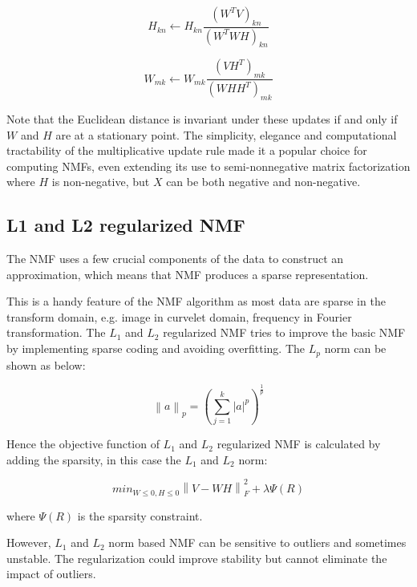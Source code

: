 \documentclass{article} %
\begin{document}
\begin{equation}
H_{kn} \gets H_{kn} \frac{\left(W^T V\right)_{kn}}{\left(W^T WH\right)_{kn}}
\end{equation}

\begin{equation}
W_{mk} \gets W_{mk} \frac{\left(V H^T\right)_{mk}}{\left(WH H^T\right)_{mk}}
\end{equation}

Note that the Euclidean distance is invariant under these updates if and only if $W$ and $H$ are at a stationary point. \cite{marques-maciel-naviner-cai-yang} The simplicity, elegance and computational tractability of the multiplicative update rule made it a popular choice for computing NMFs, even extending its use to semi-nonnegative matrix factorization where $H$ is non-negative, but $X$ can be both negative and non-negative. \cite{ding-li-jordan}

\subsection{L1 and L2 regularized NMF}
The NMF uses a few crucial components of the data to construct an approximation, which means that NMF produces a sparse representation. \cite{luo-peng-fan}

This is a handy feature of the NMF algorithm as most data are sparse in the transform domain, e.g. image in curvelet domain, frequency in Fourier transformation. The $L_1$ and $L_2$ regularized NMF tries to improve the basic NMF by implementing sparse coding and avoiding overfitting. The $L_p$ norm can be shown as below:

\begin{equation}
\left\|a\right\|_p = \left(\sum_{j=1}^{k}\left|a\right|^p\right)^{\frac{1}{p}}
\end{equation}

Hence the objective function of $L_1$ and $L_2$ regularized NMF is calculated by adding the sparsity, in this case the $L_1$ and $L_2$ norm:

\begin{equation}
min_{W \leq 0, H \leq 0}\left\|V - WH\right\|_F^2 + \lambda\Psi\left(R\right)
\end{equation}

where $\Psi\left(R\right)$ is the sparsity constraint.

However, $L_1$ and $L_2$ norm based NMF can be sensitive to outliers and sometimes unstable. The regularization could improve stability but cannot eliminate the impact of outliers.
\end{document}
